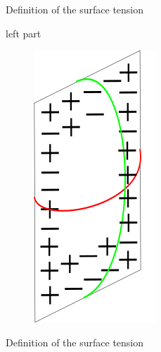 \documentclass[12pt,handout]{beamer}
\begin{document}
\begin{frame}{Definition of the surface tension}
\begin{center}



\begin{minipage}[t]{0.48\linewidth}
left part
\end{minipage}\hfill
\begin{minipage}[t]{0.48\linewidth}
\begin{figure}[!htb]
\centering
\includegraphics[scale=0.5]{antiferro.png}
\end{figure}
\end{minipage}

\end{center}
\end{frame}

\begin{frame}{Definition of the surface tension}
\begin{center}


\end{center}
\end{frame}


\end{document}
